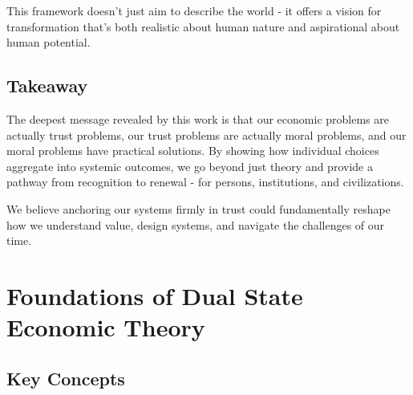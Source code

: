 \documentclass[11pt,oneside]{book}
\begin{document}
This framework doesn't just aim to describe the world - it offers a vision for transformation that's both realistic about human nature and aspirational about human potential.

\section*{Takeaway}

The deepest message revealed by this work is that our economic problems are actually trust problems, our trust problems are actually moral problems, and our moral problems have practical solutions. By showing how individual choices aggregate into systemic outcomes, we go beyond just theory and provide a pathway from recognition to renewal - for persons, institutions, and civilizations.

We believe anchoring our systems firmly in trust could fundamentally reshape how we understand value, design systems, and navigate the challenges of our time.



\chapter{ Foundations of Dual State Economic Theory}

\section{Key Concepts}
\end{document}
